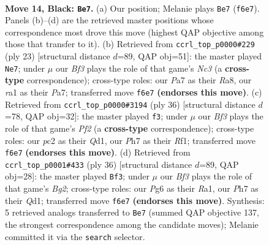 \documentclass[11pt]{article}
\begin{document}
\begin{figure}[p]
\label{fig:thought-m25}
\end{figure}

\clearpage

\begin{figure}[p]\centering
\begin{subfigure}{0.46\textwidth}\centering
\resizebox{\linewidth}{!}{%
\newchessgame
\chessboard[
  setfen={r2q1rk1/p4p1p/p3pbp1/3p4/PP1P1QP1/2N4P/2P2P2/R3K2R b KQ - 0 14},
  showmover=false,
  pgfstyle=straightmove, color=movearrow, markmove={f6-e7}
]}
\caption{}
\end{subfigure}\hfill
\begin{subfigure}{0.46\textwidth}\centering
\resizebox{\linewidth}{!}{%
\newchessgame
\chessboard[
  setfen={r2q1rk1/ppp2pp1/2n2b1p/3p4/3P3P/2N1PP2/PPQ2P2/R3KB1R b KQ - 0 12},
  showmover=false,
  pgfstyle=straightmove, color=movearrow, markmove={c6-e7}
]}
\caption{}
\end{subfigure}
\\[4pt]
\begin{subfigure}{0.46\textwidth}\centering
\resizebox{\linewidth}{!}{%
\newchessgame
\chessboard[
  setfen={2r1k2r/1p2p1bp/4q3/1N3p2/2pPn1p1/4P3/P1P1BPPP/R2Q1RK1 w k - 0 19},
  showmover=false,
  pgfstyle=straightmove, color=movearrow, markmove={f2-f3}
]}
\caption{}
\end{subfigure}\hfill
\begin{subfigure}{0.46\textwidth}\centering
\resizebox{\linewidth}{!}{%
\newchessgame
\chessboard[
  setfen={r5k1/pbpqr1pp/1p3p2/n2p4/3P1BPP/2P1P3/P4PB1/R2QR1K1 w - - 0 19},
  showmover=false,
  pgfstyle=straightmove, color=movearrow, markmove={g2-f3}
]}
\caption{}
\end{subfigure}
\caption{\textbf{Move 14, Black: \texttt{Be7}.} (a) Our position; Melanie plays \texttt{Be7} (\texttt{f6e7}). Panels (b)--(d) are the retrieved master positions whose correspondence most drove this move (highest QAP objective among those that transfer to it). (b) Retrieved from \texttt{ccrl\_top\_p0000\#229} (ply 23) [structural distance $d$=89, QAP obj=51]: the master played \texttt{Ne7}; under $\mu$ our \emph{Bf3} plays the role of that game's \emph{Nc3} (a \textbf{cross-type} correspondence); cross-type roles: our \emph{P}a7 as their \emph{R}a8, our \emph{r}a1 as their \emph{P}a7; transferred move \texttt{f6e7} \textbf{(endorses this move)}. (c) Retrieved from \texttt{ccrl\_top\_p0000\#3194} (ply 36) [structural distance $d$=78, QAP obj=32]: the master played \texttt{f3}; under $\mu$ our \emph{Bf3} plays the role of that game's \emph{Pf2} (a \textbf{cross-type} correspondence); cross-type roles: our \emph{p}c2 as their \emph{Q}d1, our \emph{P}h7 as their \emph{R}f1; transferred move \texttt{f6e7} \textbf{(endorses this move)}. (d) Retrieved from \texttt{ccrl\_top\_p0001\#433} (ply 36) [structural distance $d$=89, QAP obj=28]: the master played \texttt{Bf3}; under $\mu$ our \emph{Bf3} plays the role of that game's \emph{Bg2}; cross-type roles: our \emph{P}g6 as their \emph{R}a1, our \emph{P}h7 as their \emph{Q}d1; transferred move \texttt{f6e7} \textbf{(endorses this move)}. Synthesis: 5 retrieved analogs transferred to \texttt{Be7} (summed QAP objective 137, the strongest correspondence among the candidate moves); Melanie committed it via the \texttt{search} selector.}

\end{figure}
\end{document}
